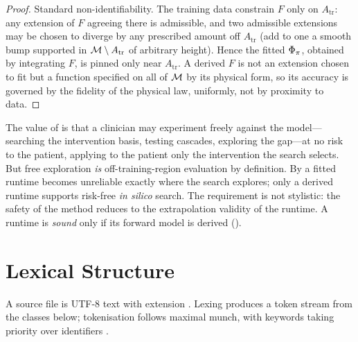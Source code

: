 \begin{proof}
Standard non-identifiability. The training data constrain $F$ only on
$A_{\mathrm{tr}}$: any extension of $F$ agreeing there is admissible, and two
admissible extensions may be chosen to diverge by any prescribed amount off
$A_{\mathrm{tr}}$ (add to one a smooth bump supported in
$\mathcal{M}\setminus A_{\mathrm{tr}}$ of arbitrary height). Hence the fitted
$\Phi_\pi$, obtained by integrating $F$, is pinned only near
$A_{\mathrm{tr}}$. A derived $F$ is not an extension chosen to fit but a
function specified on all of $\mathcal{M}$ by its physical form, so its accuracy is
governed by the fidelity of the physical law, uniformly, not by proximity to
data.
\end{proof}

\begin{principle}
\label{cfc:prin:derived}
The value of  is that a clinician may experiment freely against the
model---searching the intervention basis, testing cascades, exploring the
gap---at no risk to the patient, applying to the patient only the intervention
the search selects. But free exploration \emph{is} off-training-region
evaluation by definition. By  a fitted runtime becomes
unreliable exactly where the search explores; only a derived runtime supports
risk-free \emph{in silico} search. The requirement is not stylistic: the safety
of the method reduces to the extrapolation validity of the runtime. A 
runtime is \emph{sound} only if its forward model is derived
().
\end{principle}

\section{Lexical Structure}
\label{cfc:sec:lexical}

A  source file is UTF-8 text with extension . Lexing produces
a token stream from the classes below; tokenisation follows maximal munch, with
keywords taking priority over identifiers \citep{hopcroft2006automata}.

